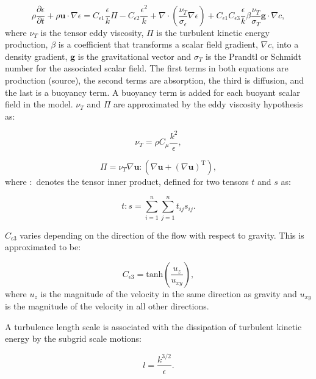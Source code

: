 \begin{equation}\label{eps}
\rho\frac{\partial \epsilon}{\partial t} + \rho\mathbf{u}\cdot\nabla \epsilon = C_{\epsilon1} \frac{\epsilon}{k} \Pi - C_{\epsilon2} \frac{\epsilon^2}{k} + \nabla\cdot\left(\frac{\nu_T}{\sigma_\epsilon} \nabla{\epsilon} \right) + C_{\epsilon1}C_{\epsilon3} \frac{\epsilon}{k} \beta \frac{\nu_T}{\sigma_T} \mathbf{g}\cdot\nabla c,
\end{equation}
where $\nu_T$ is the tensor eddy viscosity, $\Pi$ is the turbulent kinetic energy production, $\beta$ is a coefficient that transforms a scalar field gradient, $\nabla c$, into a density gradient, $\mathbf{g}$ is the gravitational vector and $\sigma_T$ is the Prandtl or Schmidt number for the associated scalar field. The first terms in both equations are production (source), the second terms are absorption, the third is diffusion, and the last is a buoyancy term. A buoyancy term is added for each buoyant scalar field in the model. $\nu_T$ and $\Pi$ are approximated by the eddy viscosity hypothesis as:

\begin{equation}\label{nut}
 \nu_T = \rho C_\mu \frac{k^2}{\epsilon},
\end{equation}

\begin{equation}\label{Pi2}
 \Pi = \nu_T \nabla\mathbf{u} : \left( \nabla\mathbf{u} + (\nabla\mathbf{u})^{\mathrm{T}} \right),
\end{equation}
where $:$ denotes the tensor inner product, defined for two tensors $t$ and $s$ as:

\begin{equation}\label{doubledot}
t:s = \sum_{i=1}^{n} \sum_{j=1}^{n} t_{ij}s_{ij}.
\end{equation}

$C_{\epsilon3}$ varies depending on the direction of the flow with respect to gravity. This is approximated to be:

\begin{equation}\label{Cepsilon3}
C_{\epsilon3} = \mathrm{tanh}\left ( \frac{u_z}{u_{xy}}  \right ),
\end{equation}
where $u_z$ is the magnitude of the velocity in the same direction as gravity and $u_{xy}$ is the magnitude of the velocity in all other directions.

A turbulence length scale is associated with the dissipation of turbulent kinetic energy by the subgrid scale motions:

\begin{equation}\label{lengthscale}
l = \frac{k^{3/2}}{\epsilon}.
\end{equation}

